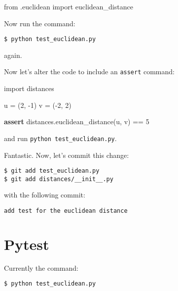 \documentclass[11pt]{article}
\newenvironment{Shaded}{}{}
\newcommand{\DecValTok}[1]{\textcolor[rgb]{0.25,0.63,0.44}{{#1}}}
\newcommand{\NormalTok}[1]{{#1}}
\newcommand{\ImportTok}[1]{{#1}}
\newcommand{\ControlFlowTok}[1]{\textcolor[rgb]{0.00,0.44,0.13}{\textbf{{#1}}}}
\newcommand{\OperatorTok}[1]{\textcolor[rgb]{0.40,0.40,0.40}{{#1}}}
\begin{document}
\begin{Shaded}
\begin{Highlighting}[]
\ImportTok{from}\NormalTok{ .euclidean }\ImportTok{import}\NormalTok{ euclidean\_distance}
\end{Highlighting}
\end{Shaded}

Now run the command:

\begin{verbatim}
$ python test_euclidean.py
\end{verbatim}

again.

Now let's alter the code to include an \texttt{assert} command:

\begin{Shaded}
\begin{Highlighting}[]
\ImportTok{import}\NormalTok{ distances}

\NormalTok{u }\OperatorTok{=}\NormalTok{ (}\DecValTok{2}\NormalTok{, }\OperatorTok{{-}}\DecValTok{1}\NormalTok{)}
\NormalTok{v }\OperatorTok{=}\NormalTok{ (}\OperatorTok{{-}}\DecValTok{2}\NormalTok{, }\DecValTok{2}\NormalTok{)}

\ControlFlowTok{assert}\NormalTok{ distances.euclidean\_distance(u, v) }\OperatorTok{==} \DecValTok{5}
\end{Highlighting}
\end{Shaded}

and run \texttt{python\ test\_euclidean.py}.

Fantastic. Now, let's commit this change:

\begin{verbatim}
$ git add test_euclidean.py
$ git add distances/__init__.py
\end{verbatim}

with the following commit:

\begin{verbatim}
add test for the euclidean distance
\end{verbatim}

    \hypertarget{pytest}{%
\section{Pytest}\label{pytest}}

Currently the command:

\begin{verbatim}
$ python test_euclidean.py
\end{verbatim}
\end{document}
